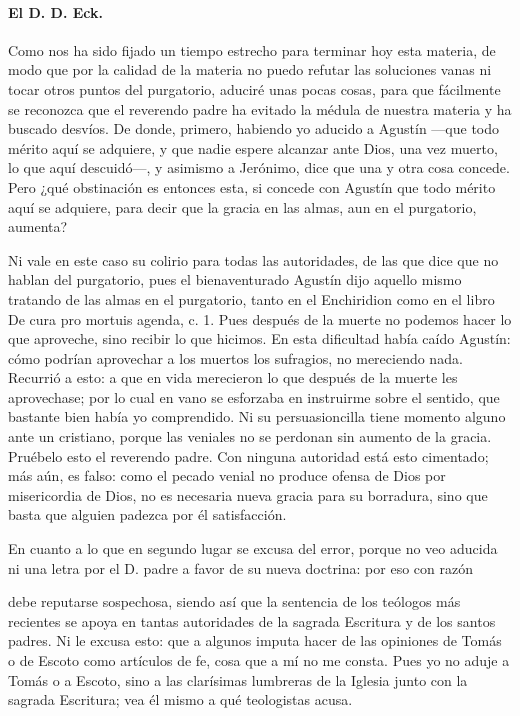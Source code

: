 \paragraph*{El D. D. Eck.}

Como nos ha sido fijado un tiempo estrecho para terminar hoy esta materia, de modo que por la calidad de la materia no puedo refutar las soluciones vanas ni tocar otros puntos del purgatorio, aduciré unas pocas cosas, para que fácilmente se reconozca que el reverendo padre ha evitado la médula de nuestra materia y ha buscado desvíos. De donde, primero, habiendo yo aducido a Agustín —que todo mérito aquí se adquiere, y que nadie espere alcanzar ante Dios, una vez muerto, lo que aquí descuidó—, y asimismo a Jerónimo, dice que una y otra cosa concede. Pero ¿qué obstinación es entonces esta, si concede con Agustín que todo mérito aquí se adquiere, para decir que la gracia en las almas, aun en el purgatorio, aumenta?

Ni vale en este caso su colirio para todas las autoridades, de las que dice que no hablan del purgatorio, pues el bienaventurado Agustín dijo aquello mismo tratando de las almas en el purgatorio, tanto en el Enchiridion como en el libro De cura pro mortuis agenda, c. 1. Pues después de la muerte no podemos hacer lo que aproveche, sino recibir lo que hicimos. En esta dificultad había caído Agustín: cómo podrían aprovechar a los muertos los sufragios, no mereciendo nada. Recurrió a esto: a que en vida merecieron lo que después de la muerte les aprovechase; por lo cual en vano se esforzaba en instruirme sobre el sentido, que bastante bien había yo comprendido. Ni su persuasioncilla tiene momento alguno ante un cristiano, porque las veniales no se perdonan sin aumento de la gracia. Pruébelo esto el reverendo padre. Con ninguna autoridad está esto cimentado; más aún, es falso: como el pecado venial no produce ofensa de Dios por misericordia de Dios, no es necesaria nueva gracia para su borradura, sino que basta que alguien padezca por él satisfacción.

En cuanto a lo que en segundo lugar se excusa del error, porque no veo aducida ni una letra por el D. padre a favor de su nueva doctrina: por eso con razón

debe reputarse sospechosa, siendo así que la sentencia de los teólogos más recientes se apoya en tantas autoridades de la sagrada Escritura y de los santos padres. Ni le excusa esto: que a algunos imputa hacer de las opiniones de Tomás o de Escoto como artículos de fe, cosa que a mí no me consta. Pues yo no aduje a Tomás o a Escoto, sino a las clarísimas lumbreras de la Iglesia junto con la sagrada Escritura; vea él mismo a qué teologistas acusa.

